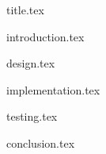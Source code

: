 \documentclass[a4paper,12pt]{article}
\begin{document}
{title.tex}

\newpage



\newpage
\vfill
\tableofcontents
\vfill
\newpage
\listoffigures

\newpage
{}



{introduction.tex}


{design.tex}

{implementation.tex}

{testing.tex}

{conclusion.tex}
\end{document}

